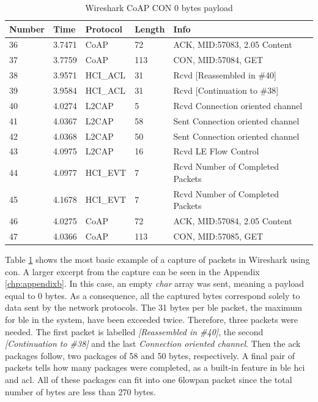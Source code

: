 \begin{table}[ht]
\centering
\caption{Wireshark CoAP CON 0 bytes payload}
\label{coapCON0table}
\begin{tabular}{lllll}
Number & Time   & Protocol & Length & Info                             \\ \hline
36     & 3.7471 & CoAP     & 72     & ACK, MID:57083, 2.05 Content     \\
37     & 3.7759 & CoAP     & 113    & CON, MID:57084, GET              \\
38     & 3.9571 & HCI\_ACL & 31     & Rcvd {[}Reassembled in \#40{]}   \\
39     & 3.9584 & HCI\_ACL & 31     & Rcvd {[}Continuation to \#38{]}  \\
40     & 4.0274 & L2CAP    & 5      & Rcvd Connection oriented channel \\
41     & 4.0367 & L2CAP    & 58     & Sent Connection oriented channel \\
42     & 4.0368 & L2CAP    & 50     & Sent Connection oriented channel \\
43     & 4.0975 & L2CAP    & 16     & Rcvd LE Flow Control             \\
44     & 4.0977 & HCI\_EVT & 7      & Rcvd Number of Completed Packets \\
45     & 4.1678 & HCI\_EVT & 7      & Rcvd Number of Completed Packets \\
46     & 4.0275 & CoAP     & 72     & ACK, MID:57084, 2.05 Content     \\
47     & 4.0366 & CoAP     & 113    & CON, MID:57085, GET              \\ \hline
\end{tabular}
\end{table}

\noindent Table \ref{coapCON0table} shows the most basic example of a capture of packets in Wireshark using \gls{con}. A larger excerpt from the capture can be seen in the Appendix \ref{chp:appendixb}. In this case, an empty \textit{char} array was sent, meaning a \gls{payload} equal to 0 \glspl{byte}. As a consequence, all the captured bytes correspond solely to data sent by the network protocols. The 31 bytes per \gls{ble} packet, the maximum for \gls{ble} in the system, have been exceeded twice. Therefore, three packets were needed. The first packet is labelled \textit{[Reassembled in \#40]}, the second \textit{[Continuation to \#38]} and the last \textit{Connection oriented channel}. Then the \gls{ack} packages follow, two packages of 58 and 50 bytes, respectively. A final pair of packets tells how many packages were completed, as a built-in feature in \gls{ble}  \gls{hci}  and \gls{acl}. All of these packages can fit into one \gls{6lowpan} packet since the total number of bytes are less than 270 bytes. %




